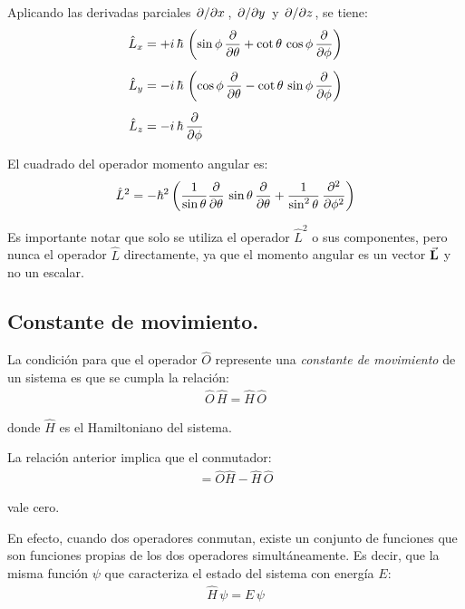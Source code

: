 Aplicando las derivadas parciales $\pdv*{x}$, $\pdv*{y}$ y $\pdv*{z}$, se tiene:
\begin{align}
\begin{aligned}
\hat{L}_{x} &= + i\, \hbar \, \left( \sin \phi \,\pdv{\theta} + \cot \theta\, \cos \phi \, \pdv{\phi} \right) \\[0.5em] 
\hat{L}_{y} &= - i\, \hbar \, \left( \cos \phi \,\pdv{\theta} - \cot \theta\, \sin \phi \, \pdv{\phi} \right) \\[0.5em] 
\hat{L}_{z} &= - i\, \hbar \, \pdv{\phi}
\end{aligned}
\label{eq:ecuacion_01_04a}
\end{align}

El cuadrado del operador momento angular es:
\begin{align}
\hat{L}^{2} = - \hbar^{2} \left( \dfrac{1}{\sin \theta} \pdv{\theta} \, \sin \theta \, \pdv{\theta} + \dfrac{1}{\sin^{2} \theta} \, \pdv[2]{\phi} \right)
\label{eq:ecuacion_01_04b}
\end{align}

Es importante notar que solo se utiliza el operador $\hat{L}^{2}$ o sus componentes, pero nunca el operador $\hat{L}$ directamente, ya que el momento angular es un vector $\va{L}$ y no un escalar.

\subsection{Constante de movimiento.}

La condición para que el operador $\hat{O}$ represente una \emph{constante de movimiento} de un sistema es que se cumpla la relación:
\begin{align}
\hat{O} \, \hat{H} = \hat{H} \, \hat{O}
\label{eq:ecuacion_01_05}
\end{align}

donde $\hat{H}$ es el Hamiltoniano del sistema.
\par
La relación anterior implica que el conmutador:
\begin{align}
[\hat{O}, \hat{H}] = \hat{O} \hat{H} - \hat{H} \, \hat{O}
\label{eq:ecuacion_01_06}
\end{align}

vale cero.
\par
En efecto, cuando dos operadores conmutan, existe un conjunto de funciones que son funciones propias de los dos operadores simultáneamente. Es decir, que la misma función $\psi$ que caracteriza el estado del sistema con energía $E$:
\begin{align*}
\hat{H} \, \psi = E \, \psi
\end{align*}

